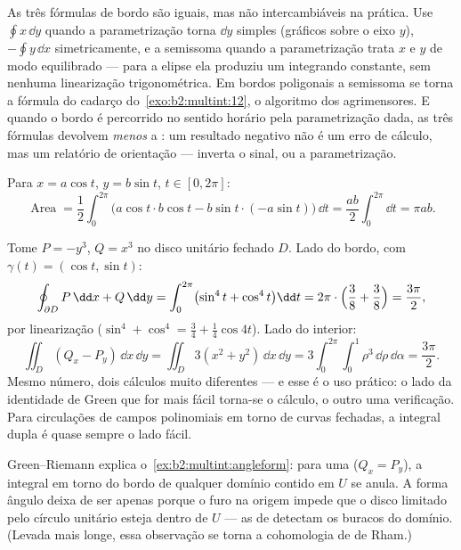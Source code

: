 \begin{remark}
As três fórmulas de bordo são iguais, mas não intercambiáveis na
prática. Use $\oint x\,\dd y$ quando a parametrização torna
$\dd y$ simples (gráficos sobre o eixo $y$), $-\oint y\,\dd x$
simetricamente, e a semissoma  quando a
parametrização trata $x$ e $y$ de modo equilibrado --- para a elipse
ela produziu um integrando constante, sem nenhuma
linearização trigonométrica. Em bordos poligonais a semissoma
se torna a fórmula do cadarço do~\cref{exo:b2:multint:12},
o algoritmo dos agrimensores. E quando o bordo é percorrido
no sentido horário pela parametrização dada, as três fórmulas
devolvem \emph{menos} a : um resultado negativo não é um
erro de cálculo, mas um relatório de orientação --- inverta o
sinal, ou a parametrização.
\end{remark}

\begin{example}\label{ex:b2:multint:ellipsearea}
Para $x = a\cos t$, $y = b\sin t$, $t \in [0, 2\pi]$:
\[
\operatorname{Area}
= \frac12\int_0^{2\pi}\bigl(a\cos t \cdot b\cos t
- b\sin t\cdot(-a\sin t)\bigr)\,\dd t
= \frac{ab}{2}\int_0^{2\pi}\dd t = \pi ab .
\]
\end{example}

\begin{example}\label{ex:b2:multint:greencheck}
Tome $P = -y^3$, $Q = x^3$ no disco unitário fechado $D$.
Lado do bordo, com $\gamma(t) = (\cos t, \sin t)$:
\[
\oint_{\partial D}P\,\dd x + Q\,\dd y
= \int_0^{2\pi}\bigl(\sin^4 t + \cos^4 t\bigr)\dd t
= 2\pi\cdot\Bigl(\frac38 + \frac38\Bigr) = \frac{3\pi}2 ,
\]
por linearização ($\sin^4 + \cos^4 = \tfrac34 +
\tfrac14\cos4t$). Lado do interior:
\[
\iint_D(Q_x - P_y)\,\dd x\,\dd y
= \iint_D 3(x^2 + y^2)\,\dd x\,\dd y
= 3\int_0^{2\pi}\!\!\int_0^1\rho^3\,\dd\rho\,\dd\alpha
= \frac{3\pi}2 .
\]
Mesmo número, dois cálculos muito diferentes --- e esse é
o uso prático: o lado da identidade de Green que for mais
fácil torna-se o cálculo, o outro uma verificação. Para
circulações de campos polinomiais em torno de curvas fechadas, a
integral dupla é quase sempre o lado fácil.
\end{example}

\begin{remark}
Green--Riemann explica o~\cref{ex:b2:multint:angleform}: para uma
 ($Q_x = P_y$), a integral em torno do bordo de qualquer
domínio contido em $U$ se anula. A forma ângulo deixa de ser 
apenas porque o furo na origem impede que o disco limitado
pelo círculo unitário esteja dentro de $U$ --- as  de
 detectam os buracos do domínio. (Levada mais longe,
essa observação se torna a cohomologia de de Rham.)
\end{remark}

